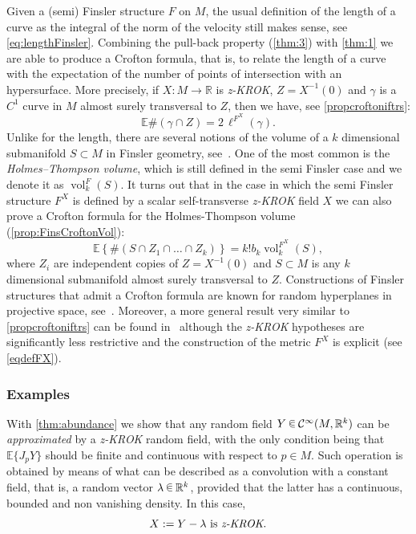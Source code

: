 \documentclass[AHL, Unicode, longabstracts, published]{cedram}
\newcommand{\R}{\mathbb{R}}
\newcommand{\EE}{\mathbb{E}}
\DeclareMathOperator{\vol}{vol}
\newcommand{\mC}{\mathcal{C}}
\newcommand{\zkrok}{\emph{z-KROK}\xspace}
\newcommand{\uball}{b}
\newcommand*\randin{
\mathchoice {\raisebox{-.35ex}{$\displaystyle{^\subset}$}\mkern-11.5mu\raisebox{+.45ex}{$\displaystyle{_\subset}$}} {\mkern+1mu\raisebox{-.27ex}{$\textstyle{^\subset}$}\mkern-11.7mu\raisebox{+.45ex}{$\textstyle{_\subset}$}} {\raisebox{.35ex}{$\scriptstyle\subset$}\mkern-14mu\raisebox{-.15ex}{$\scriptstyle\subset$}} {\raisebox{.3ex}{$\scriptscriptstyle\subset$}\mkern-13.5mu\raisebox{-.10ex}{$\scriptscriptstyle\subset$}}}
\begin{document}
Given a (semi) Finsler structure $F$ on $M$, the usual definition of the length of a curve as the integral of the norm of the velocity still makes sense, see \eqref{eq:lengthFinsler}. Combining the pull-back property (\cref{thm:3}) with \cref{thm:1} we are able to produce a Crofton formula, that is, to relate the length of a curve with the expectation of the number of points of intersection with an hypersurface. More precisely, if $X:M\to\R$ is \zkrok, $Z=X^{-1}(0)$ and $\gamma$ is a $C^1$ curve in $M$ almost surely transversal to $Z$, then we have, see \cref{propcroftoniftrs}:
\begin{equation*}
\EE\#(\gamma\cap Z)=2\,\ell^{F^X}(\gamma).
\end{equation*}
Unlike for the length, there are several notions of the volume of a $k$ dimensional submanifold $S\subset M$ in Finsler geometry, see~\cite{volumesFinsler}. One of the most common is the \emph{Holmes--Thompson volume}, which is still defined in the semi Finsler case and we denote it as $\vol^F_k(S)$. It turns out that in the case in which the semi Finsler structure $F^X$ is defined by a scalar self-transverse \zkrok field $X$ we can also prove a Crofton formula for the Holmes-Thompson volume (\cref{prop:FinsCroftonVol}):
\begin{equation*}
\EE\left\{\#(S\cap Z_1\cap \dots \cap Z_k)\right\}=k! \uball_k \vol_k^{F^{X}}(S),
\end{equation*}
where $Z_i$ are independent copies of $Z=X^{-1}(0)$ and $S\subset M$ is any $k$ dimensional submanifold almost surely transversal to $Z$. Constructions of Finsler structures that admit a Crofton formula are known for random hyperplanes in projective space, see~\cite{BernigCrofton,PaivaGelfCrof,
SchneiderCrofton}. Moreover, a more general result very similar to \cref{propcroftoniftrs} can be found in~\cite[Theorem~A]{paivageod} although the {\zkrok} hypotheses are significantly less restrictive and the construction of the metric $F^X$ is explicit (see \eqref{eqdefFX}).


\subsubsection{Examples}\label{ex:introabu}

With \cref{thm:abundance} we show that any random field ${Y\,\randin\,}\mC^\infty(M,\R^k)$ can be \emph{approximated} by a {\zkrok} random field, with the only condition being that $\EE\{J_pY\}$ should be finite and continuous with respect to $p\in M$. Such operation is obtained by means of what can be described as a convolution with a constant field, that is, a random vector $\lambda \,\randin\, \R^k$, provided that the latter has a continuous, bounded and non vanishing density. In this case,
\begin{equation}\label{eq:perturb}
X:= Y-\lambda \text{ is \zkrok.}
\end{equation}
\end{document}

